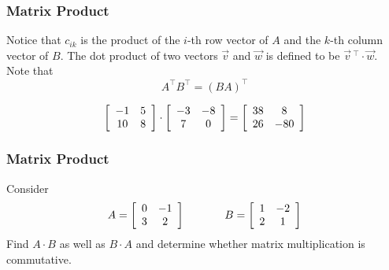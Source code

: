 \documentclass[xcolor=dvipsnames]{beamer}
\begin{document}
\begin{frame}
  \frametitle{Matrix Product}
  Notice that $c_{ik}$ is the product of the $i$-th row vector of $A$
  and the $k$-th column vector of $B$. The dot product of two vectors
  $\vec{v}$ and $\vec{w}$ is defined to be
  $\vec{v}\,^{\intercal}\cdot\vec{w}$. Note that
  \begin{equation}
    \label{eq:aidoupae}
    A^{\intercal}B^{\intercal}=\left(BA\right)^{\intercal}
  \end{equation}

\medskip

  \begin{equation}
    \label{eq:eroogaju}
    \left[
      \begin{array}{cc}
        -1 & 5 \\
        10 & 8 
      \end{array}\right]\cdot\left[
      \begin{array}{cc}
        -3 & -8 \\
        7 & 0
      \end{array}\right]=\left[
      \begin{array}{cc}
        38 & 8 \\
        26 & -80
      \end{array}\right]\notag
  \end{equation}
\end{frame}

\begin{frame}
  \frametitle{Matrix Product}
  {\ubung} Consider
  \begin{equation}
    \label{eq:tiequooh}
    A=\left[
      \begin{array}{cc}
        0 & -1 \\
        3 & 2
      \end{array}\right]\hspace{.5in}B=\left[
      \begin{array}{cc}
        1 & -2 \\
        2 & 1
      \end{array}\right]
  \end{equation}
Find $A\cdot{}B$ as well as $B\cdot{}A$ and determine whether matrix
multiplication is commutative.
\end{frame}
\end{document}
